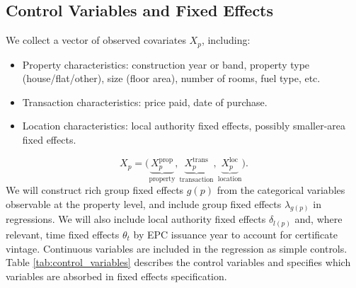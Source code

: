 \documentclass[12pt]{article}
\begin{document}
\subsection{Control Variables and Fixed Effects} \label{sec:control-fe}

We collect a vector of observed covariates $X_p$, including:

\begin{itemize}
    \item Property characteristics: construction year or band, property type (house/flat/other), size (floor area), number of rooms, fuel type, etc.
    \item Transaction characteristics: price paid, date of purchase.
    \item Location characteristics: local authority fixed effects, possibly smaller-area fixed effects. 
\end{itemize}
\[
X_p = \Big(
\underbrace{X_p^{\text{prop}}}_{\text{property}},
\underbrace{X_p^{\text{trans}}}_{\text{transaction}},
\underbrace{X_p^{\text{loc}}}_{\text{location}}
\Big).
\]
We will construct rich group fixed effects $g(p)$ from the categorical variables observable at the property level, and include group fixed effects $\lambda_{g(p)}$ in regressions. We will also include local authority fixed effects $\delta_{l(p)}$ and, where relevant, time fixed effects $\theta_t$ by EPC issuance year to account for certificate vintage. Continuous variables are included in the regression as simple controls. Table \ref{tab:control_variables} describes the control variables and specifies which variables are absorbed in fixed effects specification. 
\end{document}
